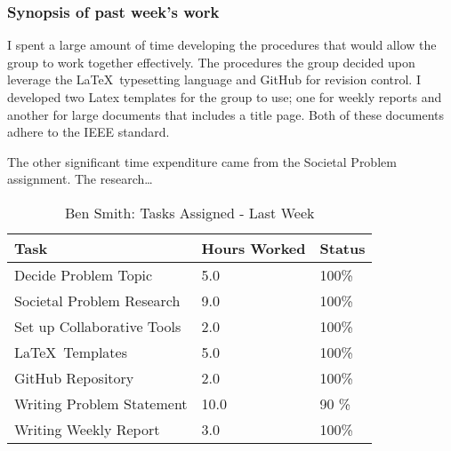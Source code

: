 \documentclass[12pt,article,compsoc]{IEEEtran}
\begin{document}
	\subsubsection*{Synopsis of past week's work}

	I spent a large amount of time developing the procedures that would allow the group to work together effectively. 
	The procedures the group decided upon leverage the \LaTeX\ typesetting language and GitHub for revision control.
	 I developed two Latex templates for the group to use; one for weekly reports and another for large documents that
	 includes a title page. Both of these documents adhere to the IEEE standard. 
	
	The other significant time expenditure came from the Societal Problem assignment. The research…

	\begin{table}[ht]
	\renewcommand{\arraystretch}{1.3}
		\caption{Ben Smith: Tasks Assigned - Last Week}
		
		\label{Summary of Ben Smith's activities: last week}
		
		\centering
		\begin{tabular}{p{5.5cm}|p{1cm}|p{1cm}}

		\hline
		\bfseries 	Task							& \bfseries Hours Worked		& \bfseries Status		\\
		\hline\hline
					Decide Problem Topic			& 5.0							& 100\%				\\
					Societal Problem Research		& 9.0							& 100\%				\\	%
					Set up Collaborative Tools		& 2.0							& 100\%				\\
					\LaTeX\ Templates				& 5.0							& 100\%				\\	%
					GitHub Repository				& 2.0							& 100\%				\\	
					Writing Problem Statement		& 10.0							& 90 \%				\\
					Writing Weekly Report			& 3.0							& 100\%				\\			
		\hline
		\end{tabular}
	\end{table}
\end{document}
